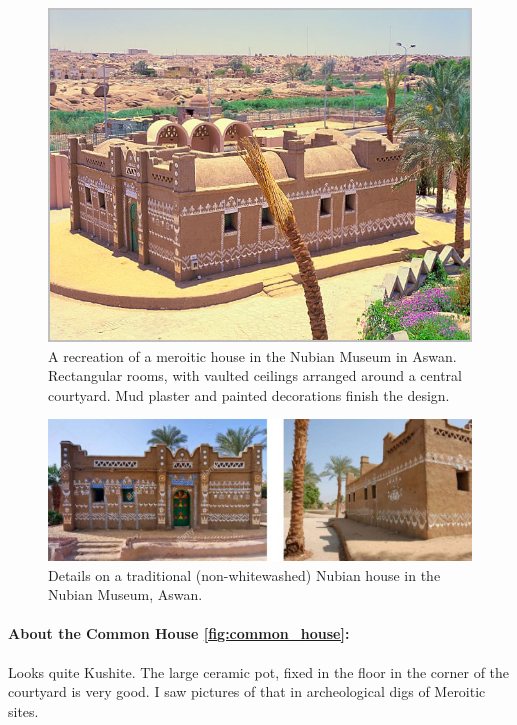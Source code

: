 \documentclass[a4paper,12pt]{scrreprt}
\begin{document}
\begin{figure}[H]
	\centering
	\includegraphics[width=\textwidth]{img/house/recreation_nubian_architecture}
	\caption{A recreation of a meroitic house in the Nubian Museum in Aswan. Rectangular rooms, with vaulted ceilings arranged around a central courtyard. Mud plaster and painted decorations finish the design.}
\end{figure}

\begin{figure}[H]
	\centering
	\includegraphics[width=\textwidth]{img/house/nubian_house_museum}
	\caption{Details on a traditional (non-whitewashed) Nubian house in the Nubian Museum, Aswan.}
\end{figure}

\paragraph{About the Common House \ref{fig:common_house}:} Looks quite Kushite. The large ceramic pot, fixed in the floor in the corner of the courtyard is very good. I saw pictures of that in archeological digs of Meroitic sites.\\
\end{document}
